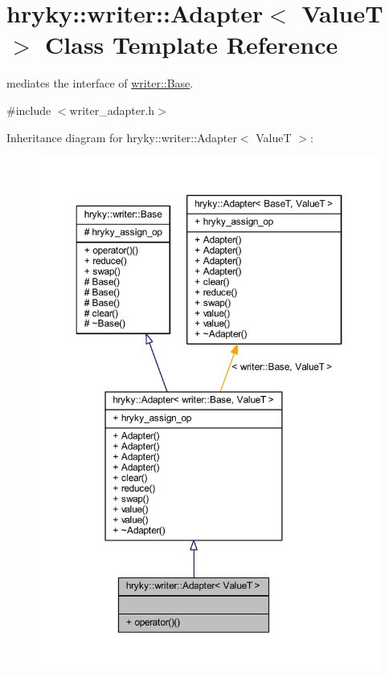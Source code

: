 \hypertarget{classhryky_1_1writer_1_1_adapter}{\section{hryky\-:\-:writer\-:\-:Adapter$<$ Value\-T $>$ Class Template Reference}
\label{classhryky_1_1writer_1_1_adapter}
}


mediates the interface of \hyperlink{classhryky_1_1writer_1_1_base}{writer\-::\-Base}.  




{\ttfamily \#include $<$writer\-\_\-adapter.\-h$>$}



Inheritance diagram for hryky\-:\-:writer\-:\-:Adapter$<$ Value\-T $>$\-:
\nopagebreak
\begin{figure}[H]
\begin{center}
\leavevmode
\includegraphics[width=350pt]{classhryky_1_1writer_1_1_adapter__inherit__graph}
\end{center}
\end{figure}
